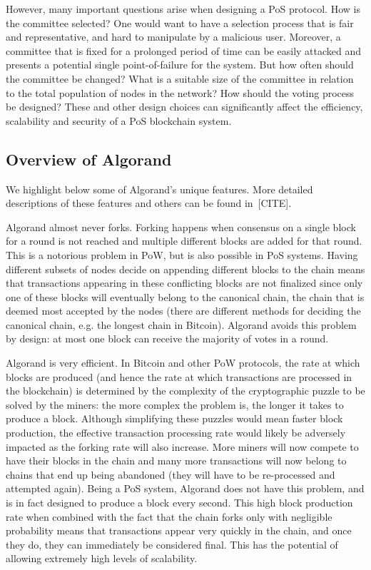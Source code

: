 However, many important questions arise when designing a PoS protocol. How is the committee selected? One would want to have a selection process that is fair and representative, and hard to manipulate by a malicious user. Moreover, a committee that is fixed for a prolonged period of time can be easily attacked and presents a potential single point-of-failure for the system. But how often should the committee be changed? What is a suitable size of the committee in relation to the total population of nodes in the network? How should the voting process be designed? These and other design choices can significantly affect the efficiency, scalability and security of a PoS blockchain system. 

\subsection{Overview of Algorand}

We highlight below some of Algorand's unique features. More detailed descriptions of these features and others can be found in~[CITE].

Algorand almost never forks. Forking happens when consensus on a single block for a round is not reached and multiple different blocks are added for that round. This is a notorious problem in PoW, but is also possible in PoS systems. Having different subsets of nodes decide on appending different blocks to the chain means that transactions appearing in these conflicting blocks are not finalized since only one of these blocks will eventually belong to the canonical chain, the chain that is deemed most accepted by the nodes (there are different methods for deciding the canonical chain, e.g. the longest chain in Bitcoin). Algorand avoids this problem by design: at most one block can receive the majority of votes in a round.

Algorand is very efficient. In Bitcoin and other PoW protocols, the rate at which blocks are produced (and hence the rate at which transactions are processed in the blockchain) is determined by the complexity of the cryptographic puzzle to be solved by the miners: the more complex the problem is, the longer it takes to produce a block. Although simplifying these puzzles would mean faster block production, the effective transaction processing rate would likely be adversely impacted as the forking rate will also increase. More miners will now compete to have their blocks in the chain and many more transactions will now belong to chains that end up being abandoned (they will have to be re-processed and attempted again). Being a PoS system, Algorand does not have this problem, and is in fact designed to produce a block every second. This high block production rate when combined with the fact that the chain forks only with negligible probability means that transactions appear very quickly in the chain, and once they do, they can immediately be considered final. This has the potential of allowing extremely high levels of scalability.

